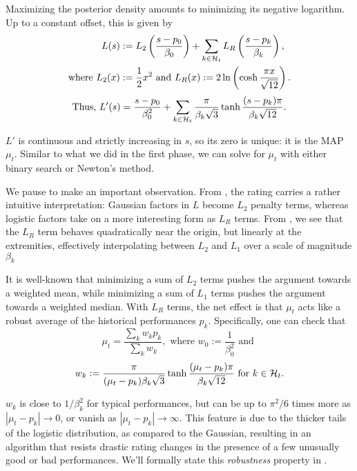 Maximizing the posterior density amounts to minimizing its negative logarithm. Up to a constant offset, this is given by
\begin{align*}
L(s) &:= L_2\left(\frac{s-p_0}{\beta_0}\right)
+ \sum_{k\in{\mathcal{H}}_t} L_R\left(\frac{s-p_k}{\beta_k}\right),
\\\text{where }L_2(x) &:= \frac 12 x^2\text{ and }
L_R(x) := 2\ln\left(\cosh \frac{\pi x}{\sqrt{12}}\right).
\end{align*}
\begin{equation}
\label{eq:loss}
\text{Thus, }L'(s) = \frac{s-p_0}{\beta_0^2} + \sum_{k\in{\mathcal{H}}_t} \frac{\pi}{\beta_k\sqrt{3}} \tanh \frac{(s-p_k)\pi}{\beta_k\sqrt{12}}.
\end{equation}

$L'$ is continuous and strictly increasing in $s$, so its zero is unique: it is the MAP $\mu_t$. Similar to what we did in the first phase, we can solve for $\mu_t$ with either binary search or Newton's method.

We pause to make an important observation. From , the rating carries a rather intuitive interpretation: Gaussian factors in $L$ become $L_2$ penalty terms, whereas logistic factors take on a more interesting form as $L_R$ terms. From , we see that the $L_R$ term behaves quadratically near the origin, but linearly at the extremities, effectively interpolating between $L_2$ and $L_1$ over a scale of magnitude $\beta_k$ 

It is well-known that minimizing a sum of $L_2$ terms pushes the argument towards a weighted mean, while minimizing a sum of $L_1$ terms pushes the argument towards a weighted median. With $L_R$ terms, the net effect is that $\mu_t$ acts like a robust average of the historical performances $p_k$. Specifically, one can check that
\[\mu_t = \frac{\sum_k w_k p_k}{\sum_k w_k}, \text{ where } w_0 := \frac{1}{\beta_0^2} \text{ and }\]
\begin{equation}
\label{eq:average}
w_k := \frac{\pi}{(\mu_t-p_k)\beta_k\sqrt{3}}\tanh\frac{(\mu_t-p_k)\pi}{\beta_k\sqrt{12}} \text{ for }k\in{\mathcal{H}}_t.
\end{equation}

$w_k$ is close to $1/\beta_k^2$ for typical performances, but can be up to $\pi^2/6$ times more as $|\mu_t-p_k| \rightarrow 0$, or vanish as $|\mu_t-p_k| \rightarrow\infty$. This feature is due to the thicker tails of the logistic distribution, as compared to the Gaussian, resulting in an algorithm that resists drastic rating changes in the presence of a few unusually good or bad performances. We'll formally state this \emph{robustness} property in .

